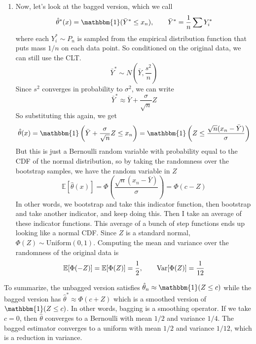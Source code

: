 \begin{example}
\begin{enumerate}
      \item Now, let's look at the bagged version, which we call 
      \begin{equation}
        \hat{\theta}^\ast (x) = \mathbbm{1} (\bar{Y}^\ast \leq x_n), \qquad \bar{Y}^\ast = \frac{1}{n} \sum Y_i^\ast
      \end{equation}
      where each $Y_i^\ast \sim P_n$ is sampled from the empirical distribution function that puts mass $1/n$ on each data point. So conditioned on the original data, we can still use the CLT. 
      \begin{equation}
        \bar{Y}^\ast \sim N(\bar{Y}, \frac{s^2}{n}) 
      \end{equation} 
      Since $s^2$ converges in probability to $\sigma^2$, we can write 
      \begin{equation}
        \bar{Y}^\ast \approx \bar{Y} + \frac{\sigma}{\sqrt{n}} Z
      \end{equation}
      So substituting this again, we get 
      \begin{equation}
        \hat{\theta}(x) = \mathbbm{1} \left( \bar{Y} + \frac{\sigma}{\sqrt{n}} Z \leq x_n \right) = \mathbbm{1} \left( Z \leq \frac{\sqrt{n} (x_n - \bar{Y})}{\sigma} \right)
      \end{equation}
      But this is just a Bernoulli random variable with probability equal to the CDF of the normal distribution, so by taking the randomness over the bootstrap samples, we have the random variable in $Z$
      \begin{equation}
        \mathbb{E} [\hat{\theta}(x)]  = \Phi \left( \frac{\sqrt{n} (x_n - \bar{Y})}{\sigma} \right) = \Phi(c - Z) 
      \end{equation} 
      In other words, we bootstrap and take this indicator function, then bootstrap and take another indicator, and keep doing this. Then I take an average of these indicator functions. This average of a bunch of step functions ends up looking like a normal CDF. Since $Z$ is a standard normal, $\Phi(Z) \sim \mathrm{Uniform}(0, 1)$. Computing the mean and variance over the randomness of the original data is 
      \begin{equation}
        \mathbb{E}[\Phi(-Z)] = \mathbb{E}[\Phi(Z)] = \frac{1}{2}, \qquad \operatorname{Var}[\Phi(Z)] = \frac{1}{12}
      \end{equation}
    \end{enumerate}

    To summarize, the unbagged version satisfies $\hat{\theta}_n \approx \mathbbm{1}(Z \leq c)$ while the bagged version has $\hat{\theta}^\ast \approx \Phi(c + Z)$ which is a smoothed version of $\mathbbm{1}(Z \leq c)$. In other words, bagging is a smoothing operator. If we take $c = 0$, then $\hat{\theta}$ converges to a Bernoulli with mean $1/2$ and variance $1/4$. The bagged estimator converges to a uniform with mean $1/2$ and variance $1/12$, which is a reduction in variance. 
  \end{example}

